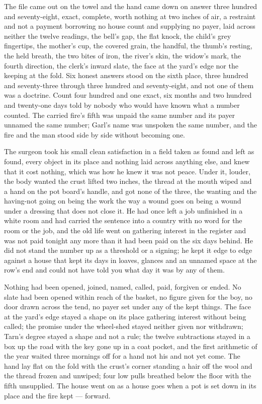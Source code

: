 \scenebreak

The file came out on the towel and the hand came down on answer three hundred and seventy-eight, exact, complete, worth nothing at two inches of air, a restraint and not a payment borrowing no house count and supplying no payer, laid across neither the twelve readings, the bell's gap, the flat knock, the child's grey fingertips, the mother's cup, the covered grain, the handful, the thumb's resting, the held breath, the two bites of iron, the river's skin, the widow's mark, the fourth direction, the clerk's inward slate, the face at the yard's edge nor the keeping at the fold. Six honest answers stood on the sixth place, three hundred and seventy-three through three hundred and seventy-eight, and not one of them was a doctrine. Count four hundred and one exact, six months and two hundred and twenty-one days told by nobody who would have known what a number counted. The carried fire's fifth was unpaid the same number and its payer unnamed the same number; Garl's name was unspoken the same number, and the fire and the man stood side by side without becoming one.

The surgeon took his small clean satisfaction in a field taken as found and left as found, every object in its place and nothing laid across anything else, and knew that it cost nothing, which was how he knew it was not peace. Under it, louder, the body wanted the crust lifted two inches, the thread at the mouth wiped and a hand on the pot board's handle, and got none of the three, the wanting and the having-not going on being the work the way a wound goes on being a wound under a dressing that does not close it. He had once left a job unfinished in a white room and had carried the sentence into a country with no word for the room or the job, and the old life went on gathering interest in the register and was not paid tonight any more than it had been paid on the six days behind. He did not stand the number up as a threshold or a signing; he kept it edge to edge against a house that kept its days in loaves, glances and an unnamed space at the row's end and could not have told you what day it was by any of them.

Nothing had been opened, joined, named, called, paid, forgiven or ended. No slate had been opened within reach of the basket, no figure given for the boy, no door drawn across the tend, no payer set under any of the kept things. The face at the yard's edge stayed a shape on its place gathering interest without being called; the promise under the wheel-shed stayed neither given nor withdrawn; Tarn's degree stayed a shape and not a rule; the twelve subtractions stayed in a box up the road with the key gone up in a coat pocket, and the first arithmetic of the year waited three mornings off for a hand not his and not yet come. The hand lay flat on the fold with the crust's corner standing a hair off the wool and the thread frozen and unwiped; four low pulls breathed below the floor with the fifth unsupplied. The house went on as a house goes when a pot is set down in its place and the fire kept --- forward.
